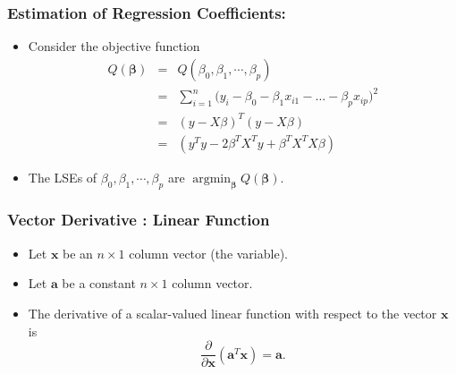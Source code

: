 \documentclass[10pt]{beamer} %
\begin{document}
\begin{frame}
   \frametitle{Estimation of Regression Coefficients: }
   \begin{itemize}
      \item Consider the objective function
         \begin{eqnarray}
             Q\left( \boldsymbol{\beta} \right)
             &=& Q(\beta_0, \beta_1, \cdots, \beta_p) \nonumber \\
             &=& \sum_{i=1}^{n}\Big(y_i - \beta_0 - \beta_1x_{i1} - \ldots -
             \beta_px_{ip} \Big)^2 \nonumber\\
             &=& (y - X\beta)^T(y - X\beta) \nonumber \\
             &=& \left( y^Ty - 2\beta^TX^Ty + \beta^TX^TX\beta \right) \nonumber
         \end{eqnarray}
      \item The LSEs of $\beta_0, \beta_1, \cdots, \beta_p$ are
         $\displaystyle \operatorname*{arg min}_{\boldsymbol{\beta}} Q\left(
         \boldsymbol{\beta} \right)$.
   \end{itemize}	

\end{frame}

\begin{frame}
    \frametitle{Vector Derivative : Linear Function}
    \begin{itemize}
       \item Let $\boldsymbol{x}$ be an $n \times 1$ column vector (the variable).
       \item Let $\boldsymbol{a}$ be a constant $n \times 1$ column vector.
       \item The derivative of a scalar-valued linear function with respect to
          the vector $\boldsymbol{x}$ is
          \[ \frac{\partial}{\partial \boldsymbol{x}} (\boldsymbol{a}^T
       \boldsymbol{x}) = \boldsymbol{a}. \]
    \end{itemize}
\end{frame}
\end{document}
